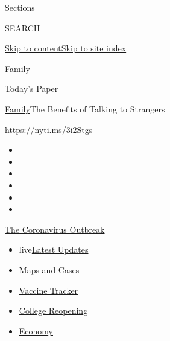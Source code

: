 Sections

SEARCH

\protect\hyperlink{site-content}{Skip to
content}\protect\hyperlink{site-index}{Skip to site index}

\href{https://www.nytimes.com/section/well/family}{Family}

\href{https://myaccount.nytimes.com/auth/login?response_type=cookie\&client_id=vi}{}

\href{https://www.nytimes.com/section/todayspaper}{Today's Paper}

\href{/section/well/family}{Family}\textbar{}The Benefits of Talking to
Strangers

\url{https://nyti.ms/3i2Stgs}

\begin{itemize}
\item
\item
\item
\item
\item
\item
\end{itemize}

\href{https://www.nytimes.com/news-event/coronavirus?action=click\&pgtype=Article\&state=default\&region=TOP_BANNER\&context=storylines_menu}{The
Coronavirus Outbreak}

\begin{itemize}
\tightlist
\item
  live\href{https://www.nytimes.com/2020/08/03/world/coronavirus-covid-19.html?action=click\&pgtype=Article\&state=default\&region=TOP_BANNER\&context=storylines_menu}{Latest
  Updates}
\item
  \href{https://www.nytimes.com/interactive/2020/us/coronavirus-us-cases.html?action=click\&pgtype=Article\&state=default\&region=TOP_BANNER\&context=storylines_menu}{Maps
  and Cases}
\item
  \href{https://www.nytimes.com/interactive/2020/science/coronavirus-vaccine-tracker.html?action=click\&pgtype=Article\&state=default\&region=TOP_BANNER\&context=storylines_menu}{Vaccine
  Tracker}
\item
  \href{https://www.nytimes.com/2020/08/02/us/covid-college-reopening.html?action=click\&pgtype=Article\&state=default\&region=TOP_BANNER\&context=storylines_menu}{College
  Reopening}
\item
  \href{https://www.nytimes.com/live/2020/08/03/business/stock-market-today-coronavirus?action=click\&pgtype=Article\&state=default\&region=TOP_BANNER\&context=storylines_menu}{Economy}
\end{itemize}

